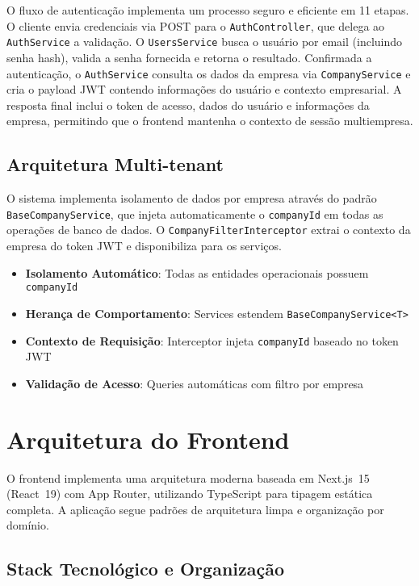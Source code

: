 O fluxo de autenticação implementa um processo seguro e eficiente em 11 etapas. O cliente envia credenciais via POST para o \texttt{AuthController}, que delega ao \texttt{AuthService} a validação. O \texttt{UsersService} busca o usuário por email (incluindo senha hash), valida a senha fornecida e retorna o resultado. Confirmada a autenticação, o \texttt{AuthService} consulta os dados da empresa via \texttt{CompanyService} e cria o payload JWT contendo informações do usuário e contexto empresarial. A resposta final inclui o token de acesso, dados do usuário e informações da empresa, permitindo que o frontend mantenha o contexto de sessão multiempresa.

\subsection{Arquitetura Multi-tenant}

O sistema implementa isolamento de dados por empresa através do padrão \texttt{BaseCompanyService}, que injeta automaticamente o \texttt{companyId} em todas as operações de banco de dados. O \texttt{CompanyFilterInterceptor} extrai o contexto da empresa do token JWT e disponibiliza para os serviços.

\begin{itemize}
  \item \textbf{Isolamento Automático}: Todas as entidades operacionais possuem \texttt{companyId}
  \item \textbf{Herança de Comportamento}: Services estendem \texttt{BaseCompanyService<T>}
  \item \textbf{Contexto de Requisição}: Interceptor injeta \texttt{companyId} baseado no token JWT
  \item \textbf{Validação de Acesso}: Queries automáticas com filtro por empresa
\end{itemize}

\section{Arquitetura do Frontend}

O frontend implementa uma arquitetura moderna baseada em Next.js~15 (React~19) com App Router, utilizando TypeScript para tipagem estática completa. A aplicação segue padrões de arquitetura limpa e organização por domínio.

\subsection{Stack Tecnológico e Organização}


